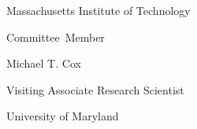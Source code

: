 \begin{flushright}
                                 Massachusetts Institute of Technology

  \vspace{10mm}

  Committee~Member\hspace{0.5cm}~\makebox[2.75in]{\hrulefill}

                                 Michael T. Cox

                                 Visiting Associate Research Scientist
                                 
                                 University of Maryland

\end{flushright}


